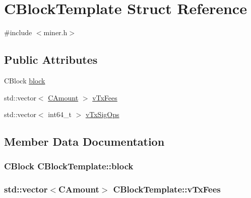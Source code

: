 \hypertarget{struct_c_block_template}{}\section{C\+Block\+Template Struct Reference}
\label{struct_c_block_template}


{\ttfamily \#include $<$miner.\+h$>$}

\subsection*{Public Attributes}
\begin{DoxyCompactItemize}
\item 
C\+Block \hyperlink{struct_c_block_template_a13261cbac4dc94f996d1b3ff78e41139}{block}
\item 
std\+::vector$<$ \hyperlink{amount_8h_a4eaf3a5239714d8c45b851527f7cb564}{C\+Amount} $>$ \hyperlink{struct_c_block_template_a66287bde795cc8e8c8cb59c4e2302d49}{v\+Tx\+Fees}
\item 
std\+::vector$<$ int64\+\_\+t $>$ \hyperlink{struct_c_block_template_a13326eb92a7d2fc073d9f5660dfcdde5}{v\+Tx\+Sig\+Ops}
\end{DoxyCompactItemize}


\subsection{Member Data Documentation}
\hypertarget{struct_c_block_template_a13261cbac4dc94f996d1b3ff78e41139}{}
\subsubsection[{block}]{\setlength{\rightskip}{0pt plus 5cm}C\+Block C\+Block\+Template\+::block}\label{struct_c_block_template_a13261cbac4dc94f996d1b3ff78e41139}
\hypertarget{struct_c_block_template_a66287bde795cc8e8c8cb59c4e2302d49}{}
\subsubsection[{v\+Tx\+Fees}]{\setlength{\rightskip}{0pt plus 5cm}std\+::vector$<${\bf C\+Amount}$>$ C\+Block\+Template\+::v\+Tx\+Fees}\label{struct_c_block_template_a66287bde795cc8e8c8cb59c4e2302d49}
\hypertarget{struct_c_block_template_a13326eb92a7d2fc073d9f5660dfcdde5}{}
